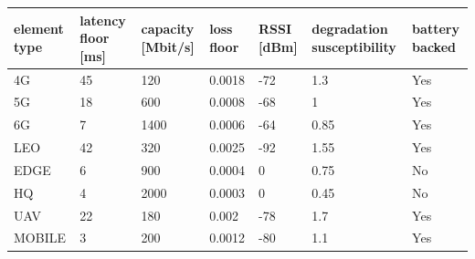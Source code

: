 \begin{tabular}{lllllll}
\toprule
element type & latency floor [ms] & capacity [Mbit/s] & loss floor & RSSI [dBm] & degradation susceptibility & battery backed \\
\midrule
4G & 45 & 120 & 0.0018 & -72 & 1.3 & Yes \\
5G & 18 & 600 & 0.0008 & -68 & 1 & Yes \\
6G & 7 & 1400 & 0.0006 & -64 & 0.85 & Yes \\
LEO & 42 & 320 & 0.0025 & -92 & 1.55 & Yes \\
EDGE & 6 & 900 & 0.0004 & 0 & 0.75 & No \\
HQ & 4 & 2000 & 0.0003 & 0 & 0.45 & No \\
UAV & 22 & 180 & 0.002 & -78 & 1.7 & Yes \\
MOBILE & 3 & 200 & 0.0012 & -80 & 1.1 & Yes \\
\bottomrule
\end{tabular}
